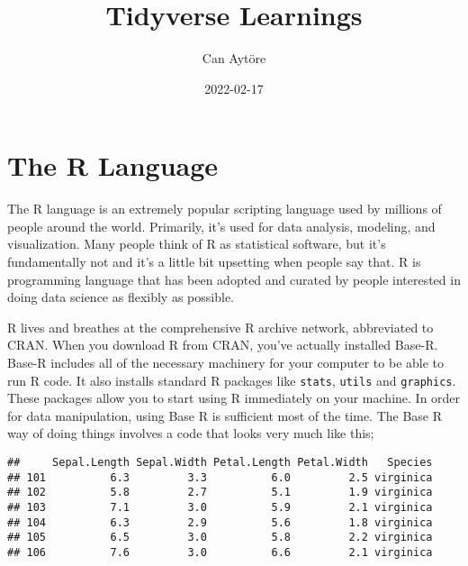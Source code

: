 \documentclass[
]{article}
\title{Tidyverse Learnings}
\author{Can Aytöre}
\date{2022-02-17}
\newenvironment{Shaded}{\begin{snugshade}}{\end{snugshade}}
\newcommand{\FunctionTok}[1]{\textcolor[rgb]{0.00,0.00,0.00}{#1}}
\newcommand{\NormalTok}[1]{#1}
\newcommand{\SpecialCharTok}[1]{\textcolor[rgb]{0.00,0.00,0.00}{#1}}
\newcommand{\StringTok}[1]{\textcolor[rgb]{0.31,0.60,0.02}{#1}}
\begin{document}
\maketitle

{
\setcounter{tocdepth}{2}
\tableofcontents
}
\hypertarget{the-r-language}{%
\section{The R Language}\label{the-r-language}}

The R language is an extremely popular scripting language used by millions of people around the world. Primarily, it's used for data analysis, modeling, and visualization. Many people think of R as statistical software, but it's fundamentally not and it's a little bit upsetting when people say that. R is programming language that has been adopted and curated by people interested in doing data science as flexibly as possible.

R lives and breathes at the comprehensive R archive network, abbreviated to CRAN. When you download R from CRAN, you've actually installed Base-R. Base-R includes all of the necessary machinery for your computer to be able to run R code. It also installs standard R packages like \texttt{stats}, \texttt{utils} and \texttt{graphics}. These packages allow you to start using R immediately on your machine. In order for data manipulation, using Base R is sufficient most of the time. The Base R way of doing things involves a code that looks very much like this;

\begin{Shaded}
\end{Shaded}

\begin{verbatim}
##     Sepal.Length Sepal.Width Petal.Length Petal.Width   Species
## 101          6.3         3.3          6.0         2.5 virginica
## 102          5.8         2.7          5.1         1.9 virginica
## 103          7.1         3.0          5.9         2.1 virginica
## 104          6.3         2.9          5.6         1.8 virginica
## 105          6.5         3.0          5.8         2.2 virginica
## 106          7.6         3.0          6.6         2.1 virginica
\end{verbatim}
\end{document}
